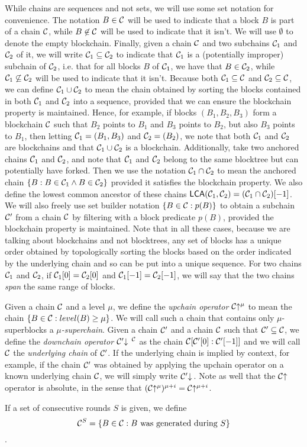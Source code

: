 While chains are sequences and not sets, we will use some set notation for
convenience. The notation $B \in \mathcal{C}$ will be used to indicate that a block
$B$ is part of a chain $\mathcal{C}$, while $B \not\in \mathcal{C}$ will be used to
indicate that it isn't. We will use $\emptyset$ to denote the empty blockchain.
Finally, given a chain $\mathcal{C}$ and two subchains $\mathcal{C}_1$ and $\mathcal{C}_2$ of
it, we will write $\mathcal{C}_1 \subseteq \mathcal{C}_2$ to indicate that $\mathcal{C}_1$ is a
(potentially improper) subchain of $\mathcal{C}_2$, i.e. that for all blocks $B$ of
$\mathcal{C}_1$, we have that $B \in \mathcal{C}_2$, while $\mathcal{C}_1 \not\subseteq
\mathcal{C}_2$ will be used to indicate that it isn't. Because both $\mathcal{C}_1
\subseteq \mathcal{C}$ and $\mathcal{C}_2 \subseteq \mathcal{C}$, we can define $\mathcal{C}_1 \cup
\mathcal{C}_2$ to mean the chain obtained by sorting the blocks contained in both
$\mathcal{C}_1$ and $\mathcal{C}_2$ into a sequence, provided that we can ensure the
blockchain property is maintained. Hence, for example, if blocks $(B_1, B_2,
B_3)$ form a blockchain $\mathcal{C}$ such that $B_2$ points to $B_1$ and $B_3$
points to $B_2$, but also $B_3$ points to $B_1$, then letting $\mathcal{C}_1 = (B_1,
B_3)$ and $\mathcal{C}_2 = (B_2)$, we note that both $\mathcal{C}_1$ and $\mathcal{C}_2$ are
blockchains and that $\mathcal{C}_1 \cup \mathcal{C}_2$ is a blockchain. Additionally,
take two anchored chains $\mathcal{C}_1$ and $\mathcal{C}_2$, and note that $\mathcal{C}_1$ and
$\mathcal{C}_2$ belong to the same blocktree but can potentially have forked. Then we
use the notation $\mathcal{C}_1 \cap \mathcal{C}_2$ to mean the anchored chain $\{B: B \in
\mathcal{C}_1 \land B \in \mathcal{C}_2\}$ provided it satisfies the blockchain property.
We also define the lowest common ancestor of these chains $\textsf{LCA}(\mathcal{C}_1,
\mathcal{C}_2) = (\mathcal{C}_1 \cap \mathcal{C}_2)[-1]$. We will also freely use set builder
notation $\{B \in \mathcal{C}: p(B)\}$ to obtain a subchain $\mathcal{C}'$ from a chain
$\mathcal{C}$ by filtering with a block predicate $p(B)$, provided the blockchain
property is maintained. Note that in all these cases, because we are talking
about blockchains and not blocktrees, any set of blocks has a unique order
obtained by topologically sorting the blocks based on the order indicated by the
underlying chain and so can be put into a unique sequence. For two chains
$\mathcal{C}_1$ and $\mathcal{C}_2$, if $\mathcal{C}_1[0] = \mathcal{C}_2[0]$ and $\mathcal{C}_1[-1] =
\mathcal{C}_2[-1]$, we will say that the two chains \textit{span} the same range of
blocks.

Given a chain $\mathcal{C}$ and a level $\mu$, we define the \textit{upchain
operator} $\mathcal{C}\negthickspace\uparrow^\mu$ to mean the chain $\{B \in \mathcal{C}: level(B) \geq
\mu\}$. We will call such a chain that contains only $\mu$-superblocks a
$\mu$\textit{-superchain}. Given a chain $\mathcal{C}'$ and a chain $\mathcal{C}$ such
that $\mathcal{C}' \subseteq \mathcal{C}$, we define the \textit{downchain operator}
$\mathcal{C}'\negthickspace\downarrow\,^{\mathcal{C}}$ as the chain $\mathcal{C}[\mathcal{C}'[0]:\mathcal{C}'[-1]]$ and we
will call $\mathcal{C}$ the \textit{underlying chain} of $\mathcal{C}'$. If the underlying
chain is implied by context, for example, if the chain $\mathcal{C}'$ was obtained by
applying the upchain operator on a known underlying chain $\mathcal{C}$, we will
simply write $\mathcal{C}'\negthickspace\downarrow\,$. Note as well that the $\mathcal{C}\negthickspace\uparrow$
operator is absolute, in the sense that $(\mathcal{C}\negthickspace\uparrow^\mu)^{\mu + i} =
\mathcal{C}\negthickspace\uparrow^{\mu + i}$.

If a set of consecutive rounds $S$ is given, we define \[\mathcal{C}^S = \{B \in
\mathcal{C}: B \text{ was generated during } S\}\].
